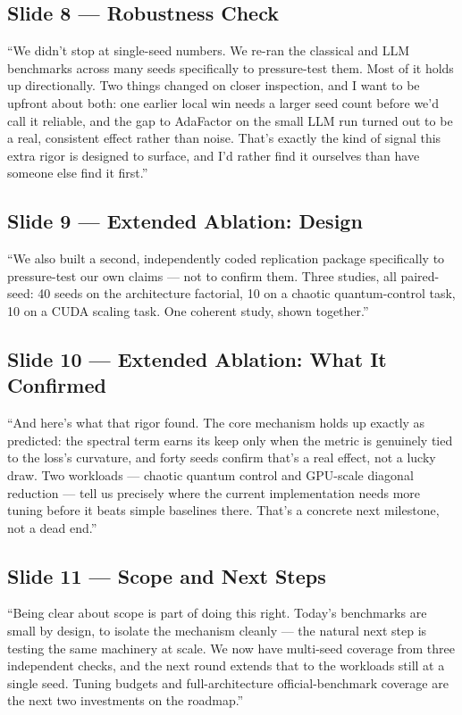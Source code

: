 \documentclass[11pt]{article}
\begin{document}
\subsection*{Slide 8 --- Robustness Check}
``We didn't stop at single-seed numbers. We re-ran the classical and LLM benchmarks across many
seeds specifically to pressure-test them. Most of it holds up directionally. Two things changed
on closer inspection, and I want to be upfront about both: one earlier local win needs a larger
seed count before we'd call it reliable, and the gap to AdaFactor on the small LLM run turned out
to be a real, consistent effect rather than noise. That's exactly the kind of signal this extra
rigor is designed to surface, and I'd rather find it ourselves than have someone else find it
first.''

\subsection*{Slide 9 --- Extended Ablation: Design}
``We also built a second, independently coded replication package specifically to pressure-test
our own claims --- not to confirm them. Three studies, all paired-seed: 40 seeds on the
architecture factorial, 10 on a chaotic quantum-control task, 10 on a CUDA scaling task. One
coherent study, shown together.''

\subsection*{Slide 10 --- Extended Ablation: What It Confirmed}
``And here's what that rigor found. The core mechanism holds up exactly as predicted: the
spectral term earns its keep only when the metric is genuinely tied to the loss's curvature, and
forty seeds confirm that's a real effect, not a lucky draw. Two workloads --- chaotic quantum
control and GPU-scale diagonal reduction --- tell us precisely where the current implementation
needs more tuning before it beats simple baselines there. That's a concrete next milestone, not a
dead end.''

\subsection*{Slide 11 --- Scope and Next Steps}
``Being clear about scope is part of doing this right. Today's benchmarks are small by design, to
isolate the mechanism cleanly --- the natural next step is testing the same machinery at scale.
We now have multi-seed coverage from three independent checks, and the next round extends that to
the workloads still at a single seed. Tuning budgets and full-architecture official-benchmark
coverage are the next two investments on the roadmap.''
\end{document}
